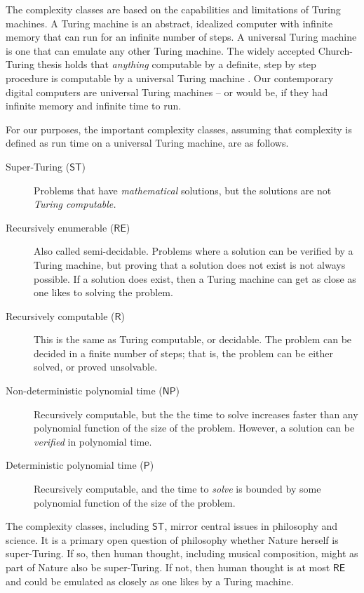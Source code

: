 \documentclass[11pt]{scrartcl}
\begin{document}
 The complexity classes are based on the capabilities and limitations of Turing machines. A Turing machine is an abstract, idealized computer with infinite memory that can run for an infinite number of steps. A universal Turing machine is one that can emulate any other Turing machine. The widely accepted Church-Turing thesis holds that \emph{anything} computable by a definite, step by step procedure is computable by a universal Turing machine  \parencite{sep-church-turing}. Our contemporary digital computers are universal Turing machines -- or would be, if they had infinite memory and infinite time to run.
 
 For our purposes, the important complexity classes, assuming that complexity is defined as run time on a universal Turing machine, are as follows.

\begin{description}
\item[Super-Turing ($\mathsf{ST}$)] Problems that have \emph{mathematical} solutions, but the solutions are not \emph{Turing computable.} 
\item[Recursively enumerable ($\mathsf{RE}$)] Also called semi-decidable. Problems where a solution can be verified by a Turing machine, but proving that a solution does not exist is not always possible. If a solution does exist, then a Turing machine can get as close as one likes to solving the problem.
\item[Recursively computable ($\mathsf{R}$)] This is the same as Turing computable, or decidable. The problem can be decided in a finite number of steps; that is, the problem can be either solved, or proved unsolvable.
\item[Non-deterministic polynomial time ($\mathsf{NP}$)] Recursively computable, but the the time to solve increases faster than any polynomial function of the size of the problem. However, a solution can be \emph{verified} in polynomial time.
\item[Deterministic polynomial  time ($\mathsf{P}$)] Recursively computable, and the time to \emph{solve} is bounded by some polynomial function of the size of the problem.
\end{description}

The complexity classes, including $\mathsf{ST}$, mirror central issues in philosophy and science. It is a primary open question of philosophy whether Nature herself is super-Turing. If so, then human thought, including musical composition, might as part of Nature also be super-Turing. If not, then human thought is at most $\mathsf{RE}$ and could be emulated as closely as one likes by a Turing machine. 
\end{document}
